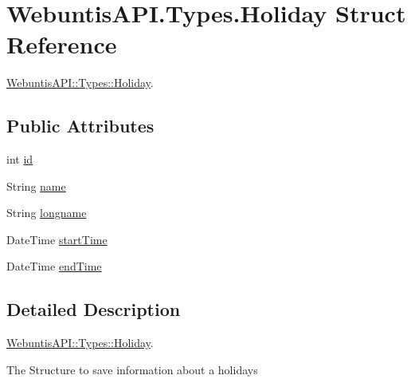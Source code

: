 \hypertarget{struct_webuntis_a_p_i_1_1_types_1_1_holiday}{\section{Webuntis\-A\-P\-I.\-Types.\-Holiday Struct Reference}
\label{struct_webuntis_a_p_i_1_1_types_1_1_holiday}
}


\hyperlink{struct_webuntis_a_p_i_1_1_types_1_1_holiday}{Webuntis\-A\-P\-I\-::\-Types\-::\-Holiday}.  


\subsection*{Public Attributes}
\begin{DoxyCompactItemize}
\item 
int \hyperlink{struct_webuntis_a_p_i_1_1_types_1_1_holiday_af850132078feaf8f2395e20a0800d74a}{id}
\item 
String \hyperlink{struct_webuntis_a_p_i_1_1_types_1_1_holiday_a092c9f61df2c8287135afb4551cbacdc}{name}
\item 
String \hyperlink{struct_webuntis_a_p_i_1_1_types_1_1_holiday_afb7e41fafeec189033e04da99946817f}{longname}
\item 
Date\-Time \hyperlink{struct_webuntis_a_p_i_1_1_types_1_1_holiday_a489a91e746530bfed3300c39533297f1}{start\-Time}
\item 
Date\-Time \hyperlink{struct_webuntis_a_p_i_1_1_types_1_1_holiday_a8554b4c5a0b600762065145df7666519}{end\-Time}
\end{DoxyCompactItemize}


\subsection{Detailed Description}
\hyperlink{struct_webuntis_a_p_i_1_1_types_1_1_holiday}{Webuntis\-A\-P\-I\-::\-Types\-::\-Holiday}. 

The Structure to save information about a holidays 


